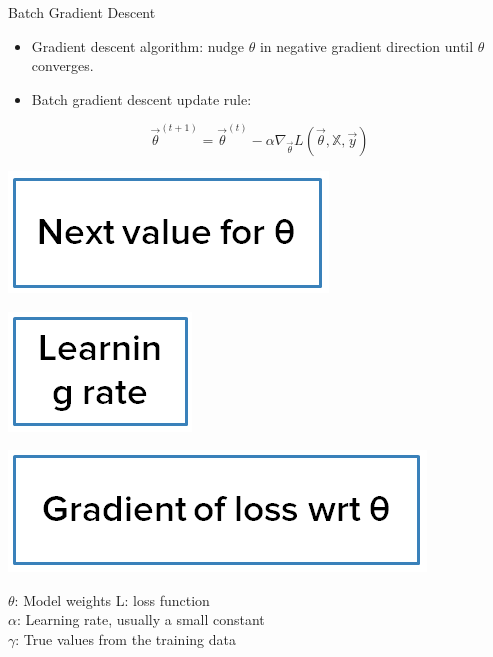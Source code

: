 \documentclass[aspectratio=169]{../latex_main/tntbeamer}  %
\begin{document}
	
	\begin{frame}{Batch Gradient Descent}
	    \begin{itemize}
	        \item Gradient descent algorithm: nudge $\theta$ in negative gradient direction until $\theta$ converges.
	        \item Batch gradient descent update rule:
	    \end{itemize}
	    \vspace{2cm}
	    \begin{equation*}
	        \Vec{\theta}^{(t+1)} = \Vec{\theta}^{(t)} - \alpha \nabla_{\Vec{\theta}}L(\Vec{\theta}, \mathbb{X}, \Vec{y})
	    \end{equation*}
	    \vspace{-2cm}
	    
	    
	    \vspace{.7cm}
	    \hspace{2cm} \includegraphics[scale=.3]{Bild24}\\
	    \vspace{-.7cm}
	    
	    \vspace{0.7cm}
	    \hspace{6.3cm} \includegraphics[scale=.3]{Bild25}\\
	    \vspace{-0.7cm}
	    
	    \vspace{-1.3cm}
	    \hspace{10.3cm} \includegraphics[scale=.3]{Bild26}\\
	    \vspace{1.3cm}
	    
	    

	    $\theta$: Model weights \hspace{2cm} L: loss function\\
	    $\alpha$: Learning rate, usually a small constant\\
	    $\gamma$: True values from the training data 
	\end{frame}
	
\end{document}
